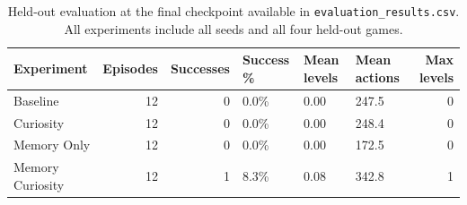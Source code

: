 \begin{table}
\caption{Held-out evaluation at the final checkpoint available in \texttt{evaluation\_results.csv}. All experiments include all seeds and all four held-out games.}
\label{tab:results}
\begin{tabular}{lrrlllr}
\toprule
Experiment & Episodes & Successes & Success \% & Mean levels & Mean actions & Max levels \\
\midrule
Baseline & 12 & 0 & 0.0\% & 0.00 & 247.5 & 0 \\
Curiosity & 12 & 0 & 0.0\% & 0.00 & 248.4 & 0 \\
Memory Only & 12 & 0 & 0.0\% & 0.00 & 172.5 & 0 \\
Memory Curiosity & 12 & 1 & 8.3\% & 0.08 & 342.8 & 1 \\
\bottomrule
\end{tabular}
\end{table}
